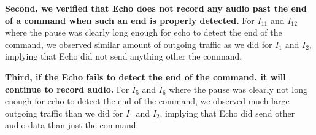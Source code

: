 \textbf{Second, we verified that Echo does not record any audio past the end of a command when such an end is properly detected.} For $I_{11}$ and $I_{12}$ where the pause was clearly long enough for echo to detect the end of the command, we observed similar amount of outgoing traffic as we did for $I_{1}$ and $I_{2}$, implying that Echo did not send anything other the command.

\textbf{Third, if the Echo fails to detect the end of the command, it will continue to record audio.} For $I_{5}$ and $I_{6}$ where the pause was clearly not long enough for echo to detect the end of the command, we observed much large outgoing traffic than we did for $I_{1}$ and $I_{2}$, implying that Echo did send other audio data than just the command.
